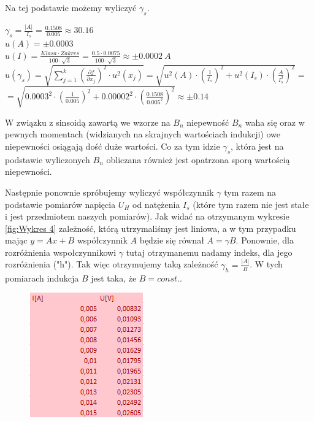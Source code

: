 \documentclass{article}
\begin{document}
Na tej podstawie możemy wyliczyć $\gamma_{s}$.
\begin{flushleft}
    \vspace{2.5ex}
    $\gamma_{s}=\frac{|A|}{I_{s}}=\frac{0.1508}{0.005}\approx30.16$\\
    \vspace{2.5ex}
    $u(A)=\pm0.0003$\\
    \vspace{2.5ex}
    $u(I)=\frac{Klasa\cdot Zakres}{100\cdot \sqrt{3}}=\frac{0.5\cdot0.0075}{100\cdot \sqrt{3}}\approx\pm0.0002 \ A$\\
    \vspace{2.5ex}
    $u(\gamma_{s})=\sqrt{\sum^{k}_{j=1}\left(\frac{\partial f}{\partial x_{j}}\right)^{2}\cdot u^{2}(x_{j})}=\sqrt{u^{2}(A)\cdot\left(\frac{1}{I_{s}}\right)^{2}+u^{2}(I_{s})\cdot(\frac{A}{I_{s}^{2}})^{2}}=$\\
    \vspace{2.5ex}
    $=\sqrt{0.0003^{2}\cdot\left(\frac{1}{0.005}\right)^{2}+0.00002^{2}\cdot(\frac{0.1508}{0.005^{2}})^{2}}  \approx\pm0.14$\\
    \vspace{2.5ex}
\end{flushleft}
W związku z sinsoidą zawartą we wzorze na $B_{n}$ niepewność $B_{n}$ waha się oraz w pewnych momentach (widzianych na skrajnych wartościach indukcji) owe niepewności osiągają dość duże wartości. Co za tym idzie $\gamma_{s}$, która jest na podstawie wyliczonych $B_{n}$ obliczana również jest opatrzona sporą wartością niepewności.\\

\par Następnie ponownie spróbujemy wyliczyć współczynnik $\gamma$ tym razem na podstawie pomiarów napięcia $U_{H}$ od natężenia $I_{s}$ (które tym razem nie jest stałe i jest przedmiotem naszych pomiarów). Jak widać na otrzymanym wykresie \ref{fig:Wykres 4} zależność, którą utrzymaliśmy jest liniowa, a w tym przypadku mając $y=Ax+B$ współczynnik $A$ będzie się równał $A=\gamma B$. Ponownie, dla rozróżnienia wspołczynnikowi $\gamma$ tutaj otrzymanemu nadamy indeks, dla jego rozróżnienia ("h"). Tak więc otrzymujemy taką zależność $\gamma_{h}=\frac{|A|}{B}$. W tych pomiarach indukcja $B$ jest taka, że $B=const.$.

\begin{figure}[h!]
    \centering
    \includegraphics[scale=1.1]{pake.png}
\end{figure}
\end{document}
